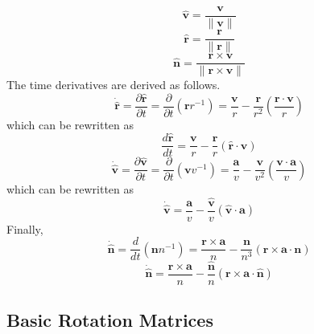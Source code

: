 {\begin{equation}
     \boxed{\hat{\mathbf{v}} = \frac{\mathbf{v}}{\| \mathbf{v}
     \|}}
\end{equation}
%
\begin{equation}
\boxed{\hat{\mathbf{r}} = \frac{\mathbf{r}}{\| \mathbf{r}
     \|}}
\end{equation}
%
\begin{equation}
     \boxed{\hat{\mathbf{n}} = \frac{\mathbf{r}\times \mathbf{v}}{ \| \mathbf{r}\times \mathbf{v}
     \|}}
\end{equation}
%
The time derivatives are derived as follows.
%
\begin{equation}
    \dot{\hat{\mathbf{r}}} =
    \frac{\partial \hat{\mathbf{r}}}{ \partial t} = \frac{\partial }{ \partial
    t}\left( \mathbf{r} r^{-1}  \right) = \frac{\mathbf{v}}{r} -
    \frac{\mathbf{r}}{r^2}\left(\frac{\mathbf{r}\cdot\mathbf{v}}{r}\right)
\end{equation}
%
which can be rewritten as
%
\begin{equation}
    \boxed{\frac{d\hat{\mathbf{r}}}{dt} = \frac{\mathbf{v}}{r}  -
     \frac{\hat{\mathbf{r}}}{r}
     \left(\hat{\mathbf{r}} \cdot
     \mathbf{v} \right)}
\end{equation}
%
\begin{equation}
    \dot{\hat{\mathbf{v}}} =
    \frac{\partial \hat{\mathbf{v}}}{ \partial t} = \frac{\partial }{ \partial
    t}\left( \mathbf{v} v^{-1}  \right) = \frac{\mathbf{a}}{v} -
    \frac{\mathbf{v}}{v^2}\left(\frac{\mathbf{v}\cdot\mathbf{a}}{v}\right)
\end{equation}
%
which can be rewritten as
%
\begin{equation}
    \boxed{\dot{\hat{\mathbf{v}}} = \frac{\mathbf{a}}{v} -
    \frac{\hat{\mathbf{v}}}{v}\left(\hat{\mathbf{v}}\cdot\mathbf{a}\right)}
\end{equation}
%
Finally,
%
\begin{equation}
     \dot{\hat{\mathbf{n}}} = \frac{d}{dt}\left( \mathbf{n} n^{-1}
     \right)= \frac{\mathbf{r} \times \mathbf{a}}{n} - \frac{\mathbf{n}}{n^3} \left(  \mathbf{r}\times\mathbf{a} \cdot \mathbf{n} \right)
\end{equation}
%
\begin{equation}
     \boxed{\dot{\hat{\mathbf{n}}} = \frac{\mathbf{r} \times \mathbf{a}}{n} - \frac{\hat{\mathbf{n}}}{n} \left(  \mathbf{r}\times\mathbf{a} \cdot \hat{\mathbf{n}} \right)
     }
\end{equation}

\subsection{Basic Rotation Matrices} \label{sec:BasicRotationMatrices}

}
